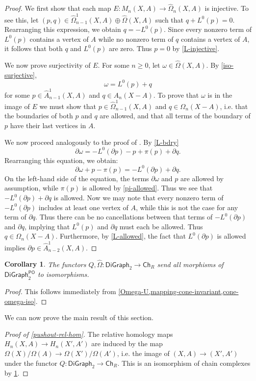 \documentclass[11pt]{article}
\newtheorem{corollary}[theo]{Corollary}
\theoremstyle{definition}
\numberwithin{equation}{section}
\newcommand{\Ch}{\mathsf{Ch}}
\newcommand{\Cof}{\mathsf{DiGraph}_2}
\newcommand{\CofPO}{\mathsf{DiGraph}_2^{\mathsf{PO}}}
\newcommand{\tOmega}{\widehat{\Omega}}
\newcommand{\tOmegaOne}{\widehat{\Omega}^1}
\newcommand{\tAOne}{\widehat{A}^1}
\newcommand{\bd}{\partial}
\begin{document}
\begin{proof}
We first show that each map $E \colon M_n(X,A) \to \tOmega_n(X,A)$ is injective. To see this, let $(p,q) \in \tOmegaOne_{n-1}(X,A) \oplus \tOmega(X,A)$ such that $q + L^0(p) = 0$. Rearranging this expression, we obtain $q = -L^0(p)$. 
Since every nonzero term of $L^0(p)$ contains a vertex of $A$ while no nonzero term of $q$ contains a vertex of $A$, it follows that both $q$ and $L^0(p)$ are zero. Thus $p = 0$ by \cref{L-injective}.

We now prove surjectivity of $E$. For some $n \geq 0$, let $\omega \in \tOmega(X,A)$. By \cref{iso-surjective},  \[\omega = L^0(p) + q\]for some $p \in \tAOne_{n-1}(X,A)$ and $ q \in A_n(X-A)$. To prove that $\omega$ is in the image of $E$ we must show that $p \in \tOmegaOne_{n-1}(X,A)$ and $q \in \Omega_n(X-A)$, i.e.  that the boundaries of both $p$ and $q$ are allowed, and that all terms of the boundary of $p$ have their last vertices in $A$.

We now proceed analogously to the proof of \cite[Lem.~3.10]{grigor'yan-jimenez-muranov-yau}. By \cref{L-bdry}
\[
\bd \omega = -L^0(\bd p) - p + \pi(p) + \bd q.
\]
Rearranging this equation, we obtain:
\[
\bd \omega + p - \pi(p) = -L^0(\bd p) + \bd q.
\]
On the left-hand side of the equation, the terms $\bd \omega$ and $p$ are allowed by assumption, while $\pi(p)$ is allowed by \cref{pi-allowed}. Thus we see that $-L^0(\bd p) + \bd q$ is allowed. Now we may note that every nonzero term of $-L^0(\bd p)$ includes at least one vertex of $A$, while this is not the case for any term of $\bd q$. 
Thus there can be no cancellations between that terms of $-L^0(\bd p)$ and $\bd q$, implying that $L^0(p)$ and $\bd q$ must each be allowed. Thus $q \in \Omega_n(X-A)$. Furthermore, by \cref{L-allowed}, the fact that $L^0(\bd p)$ is allowed implies $\bd p \in \tAOne_{n-2}(X,A)$.
\end{proof}

\begin{corollary}\label{Q-T-core}
The functors $Q, \tOmega \colon \Cof \to \Ch_R$ send all morphisms of $\CofPO$ to isomorphisms.
\end{corollary}

\begin{proof}
This follows immediately from \cref{Omega-U,mapping-cone-invariant,cone-omega-iso}.
\end{proof}

We can now prove the main result of this section.

\begin{proof}[Proof of \cref{pushout-rel-hom}]
The relative homology maps $H_n(X,A) \to H_n(X',A')$ are induced by the map $\Omega(X) / \Omega(A) \to \Omega(X') / \Omega(A')$, i.e.  the image of $(X,A) \to (X',A')$ under the functor $Q \colon \Cof \to \Ch_R$. This is an isomorphism of chain complexes by \cref{Q-T-core}.
\end{proof}
\end{document}
